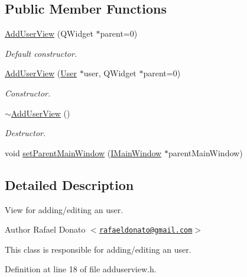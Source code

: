 \subsection*{\-Public \-Member \-Functions}
\begin{DoxyCompactItemize}
\item 
\hyperlink{class_add_user_view_a73ce516bc191fcb736ebc2e1ed2f486b}{\-Add\-User\-View} (\-Q\-Widget $\ast$parent=0)
\begin{DoxyCompactList}\small\item\em \-Default constructor. \end{DoxyCompactList}\item 
\hyperlink{class_add_user_view_af812ae4aeb90ab6eefe5866cfabf8d48}{\-Add\-User\-View} (\hyperlink{class_user}{\-User} $\ast$user, \-Q\-Widget $\ast$parent=0)
\begin{DoxyCompactList}\small\item\em \-Constructor. \end{DoxyCompactList}\item 
\hyperlink{class_add_user_view_a84b93539ac53f3e4d19218a959f321d0}{$\sim$\-Add\-User\-View} ()
\begin{DoxyCompactList}\small\item\em \-Destructor. \end{DoxyCompactList}\item 
void \hyperlink{class_add_user_view_a0113e0e02b7a9b3bb864f4c055b90adc}{set\-Parent\-Main\-Window} (\hyperlink{class_i_main_window}{\-I\-Main\-Window} $\ast$parent\-Main\-Window)
\end{DoxyCompactItemize}


\subsection{\-Detailed \-Description}
\-View for adding/editing an user. 

\begin{DoxyAuthor}{\-Author}
\-Rafael \-Donato $<$\href{mailto:rafaeldonato@gmail.com}{\tt rafaeldonato@gmail.\-com}$>$
\end{DoxyAuthor}
\-This class is responsible for adding/editing an user. 

\-Definition at line 18 of file adduserview.\-h.



